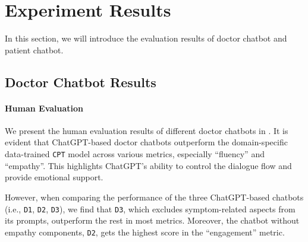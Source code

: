 \section{Experiment Results}
In this section, we will introduce the evaluation results of doctor chatbot and patient chatbot. 


\subsection{Doctor Chatbot Results}
\paragraph{Human Evaluation}
We present the human evaluation results of different doctor chatbots in . It is evident that ChatGPT-based doctor chatbots outperform the domain-specific data-trained \texttt{CPT} model across various metrics, especially ``fluency'' and ``empathy''. This highlights ChatGPT's ability to control the dialogue flow and provide emotional support. 

However, when comparing the performance of the three ChatGPT-based chatbots (i.e., \texttt{D1}, \texttt{D2}, \texttt{D3}), we find that
\texttt{D3}, which excludes symptom-related aspects from its prompts, outperform the rest in most metrics. Moreover, the chatbot without empathy components, \texttt{D2}, gets the highest score in the ``engagement'' metric. 

